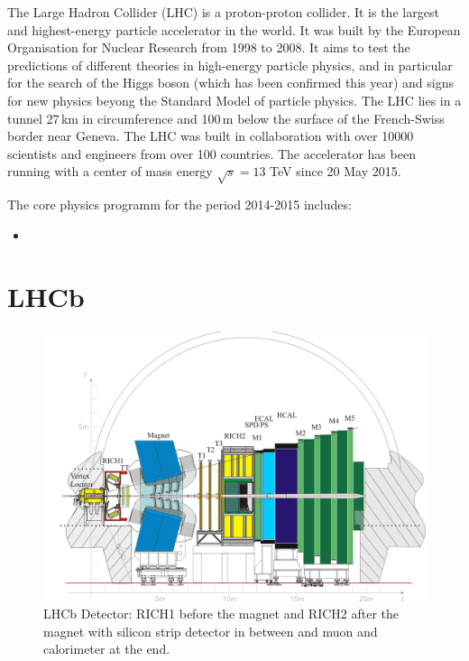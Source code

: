 \documentclass[11pt,twoside]{scrreprt}
\begin{document}
The Large Hadron Collider (LHC) is a proton-proton collider. It is the largest and highest-energy particle accelerator in the world. It was built by the European Organisation for Nuclear Research from 1998 to 2008. It aims to test the predictions of different theories in high-energy particle physics, and in particular for the search of the Higgs boson (which has been confirmed this year) and signs for new physics beyong the Standard Model of particle physics. The LHC lies in a tunnel 27\,km in circumference and 100\,m below the surface of the French-Swiss border near Geneva. The LHC was built in collaboration with over 10000 scientists and engineers from over 100 countries. The accelerator has been running with a center of mass energy $\sqrt{s} = 13$ TeV since 20 May 2015.


The core physics programm for the period 2014-2015 includes:

\begin{itemize}
  \item <COMMENT: PROGRAM>
\end{itemize}




\section{LHCb}

\begin{figure}[tb]
  \centering
  \includegraphics[width=\textwidth]{pics/lhcb_detector}
  \caption{LHCb Detector: RICH1 before the magnet and RICH2 after the magnet with silicon strip detector in between and muon and calorimeter at the end.}
  \label{fig:lhcb}
\end{figure}
\end{document}
